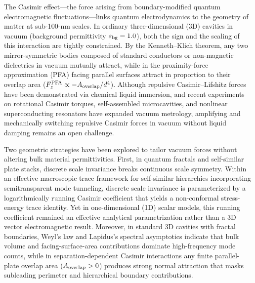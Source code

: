 \documentclass[pdflatex,sn-nature]{sn-jnl}
\begin{document}
\maketitle

The Casimir effect---the force arising from boundary-modified quantum electromagnetic fluctuations\cite{casimir1948,bordag2009}---links quantum electrodynamics to the geometry of matter at sub-100-nm scales. In ordinary three-dimensional (3D) cavities in vacuum (background permittivity $\varepsilon_{\rm bg}=1.0$), both the sign and the scaling of this interaction are tightly constrained. By the Kenneth--Klich theorem\cite{kennethklich2006}, any two mirror-symmetric bodies composed of standard conductors or non-magnetic dielectrics in vacuum mutually attract, while in the proximity-force approximation (PFA) facing parallel surfaces attract in proportion to their overlap area ($F_z^{\rm PFA} \propto -A_{\rm overlap}/d^4$). Although repulsive Casimir--Lifshitz forces have been demonstrated via chemical liquid immersion\cite{munday2009}, and recent experiments on rotational Casimir torques\cite{somers2018}, self-assembled microcavities\cite{munkhbat2021}, and nonlinear superconducting resonators\cite{dejong2026} have expanded vacuum metrology, amplifying and mechanically switching repulsive Casimir forces in vacuum without liquid damping remains an open challenge\cite{rodriguez2011}.

Two geometric strategies have been explored to tailor vacuum forces without altering bulk material permittivities. First, in quantum fractals\cite{kempkes2019,xu2021} and self-similar plate stacks\cite{akkermans2010,shajesh2016,shajesh2017}, discrete scale invariance breaks continuous scale symmetry. Within an effective macroscopic trace framework for self-similar hierarchies incorporating semitransparent mode tunneling\cite{milton2004,milton2016,gordon2026prd}, discrete scale invariance is parameterized by a logarithmically running Casimir coefficient that yields a non-conformal stress-energy trace identity. Yet in one-dimensional (1D) scalar models\cite{gordon2026prd}, this running coefficient remained an effective analytical parametrization rather than a 3D vector electromagnetic result. Moreover, in standard 3D cavities with fractal boundaries, Weyl's law and Lapidus's spectral asymptotics\cite{lapidus1991} indicate that bulk volume and facing-surface-area contributions dominate high-frequency mode counts, while in separation-dependent Casimir interactions any finite parallel-plate overlap area ($A_{\rm overlap} > 0$) produces strong normal attraction that masks subleading perimeter and hierarchical boundary contributions.
\end{document}
